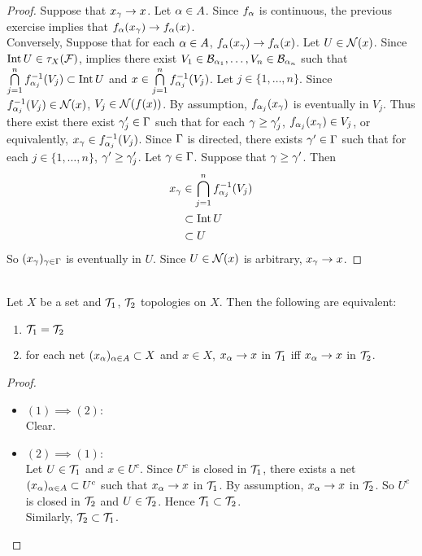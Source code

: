 \documentclass{book}
\begin{document}
	\begin{proof}
	Suppose that $x_{\gamma} \rightarrow x$. Let $\alpha \in A$. Since $f_{\alpha}$ is continuous, the previous exercise implies that $f_{\alpha}(x_{\gamma}) \rightarrow f_{\alpha}(x)$. \\
	Conversely, Suppose that for each $\alpha \in A$,  $f_{\alpha}(x_{\gamma}) \rightarrow f_{\alpha}(x)$. Let $U \in \mathcal{N}(x)$. Since $\operatorname{Int} U \in \tau_X(\mathcal{F})$,  implies there exist $V_1 \in \mathcal{B}_{\alpha_1}, \ldots, V_n \in \mathcal{B}_{\alpha_n}$ such that $\bigcap\limits_{j=1}^n f_{\alpha_j}^{-1}(V_j) \subset \operatorname{Int} U$ and $x \in \bigcap\limits_{j=1}^n f_{\alpha_j}^{-1}(V_j)$. Let $j \in \{1, \ldots, n\}$. Since $f_{\alpha_j}^{-1}(V_j) \in \mathcal{N}(x)$, $V_j \in \mathcal{N}(f(x))$. By assumption, $f_{\alpha_j}(x_{\gamma})$ is eventually in $V_j$. Thus there exist there exist $\gamma'_j \in \Gamma$ such that for each $\gamma \geq \gamma'_j$, $f_{\alpha_j}(x_{\gamma}) \in V_j$, or equivalently, $x_{\gamma} \in f_{\alpha_j}^{-1}(V_j)$. Since $\Gamma$ is directed, there exists $\gamma' \in \Gamma$ such that for each $j \in \{1, \ldots, n\}$, $\gamma' \geq \gamma'_j$. Let $\gamma \in \Gamma$. Suppose that $\gamma \geq \gamma'$. Then 
	\begin{align*}
	x_{\gamma} 
	& \in \bigcap\limits_{j=1}^n f_{\alpha_j}^{-1}(V_j) \\
	& \subset \operatorname{Int} U \\
	& \subset U
\end{align*}	
	So $(x_\gamma)_{\gamma \in \Gamma}$ is eventually in $U$. Since $U \in \mathcal{N}(x)$ is arbitrary, $x_{\gamma} \rightarrow x$.  
	\end{proof}
	
	
	\begin{ex} 
	\\
	Let $X$ be a set and $\mathcal{T}_1$, $\mathcal{T}_2$ topologies on $X$. Then the following are equivalent:
	\begin{enumerate}
		\item $\mathcal{T}_1 = \mathcal{T}_2$
		\item for each net $(x_{\alpha})_{\alpha \in A} \subset X$ and $x \in X$, $x_{\alpha} \rightarrow x$ in $\mathcal{T}_1$ iff $x_{\alpha} \rightarrow x$ in $\mathcal{T}_2$.
	\end{enumerate}
	\end{ex}

	\begin{proof}\
		\begin{itemize}
			\item $(1) \implies (2)$: \\
			Clear. \\
			\item $(2) \implies (1)$: \\
			Let $U \in \mathcal{T}_1$ and $x \in U^c$. Since $U^c$ is closed in $\mathcal{T}_1$, there exists a net $(x_{\alpha})_{\alpha \in A} \subset U^c$ such that $x_{\alpha} \rightarrow x$ in $\mathcal{T}_1$. By assumption, $x_{\alpha} \rightarrow x$ in $\mathcal{T}_2$. So $U^c$ is closed in $\mathcal{T}_2$ and $U \in \mathcal{T}_2$. Hence $\mathcal{T}_1 \subset \mathcal{T}_2$. \\
			Similarly, $\mathcal{T}_2 \subset \mathcal{T}_1$.
		\end{itemize}
	\end{proof}
	
\end{document}
